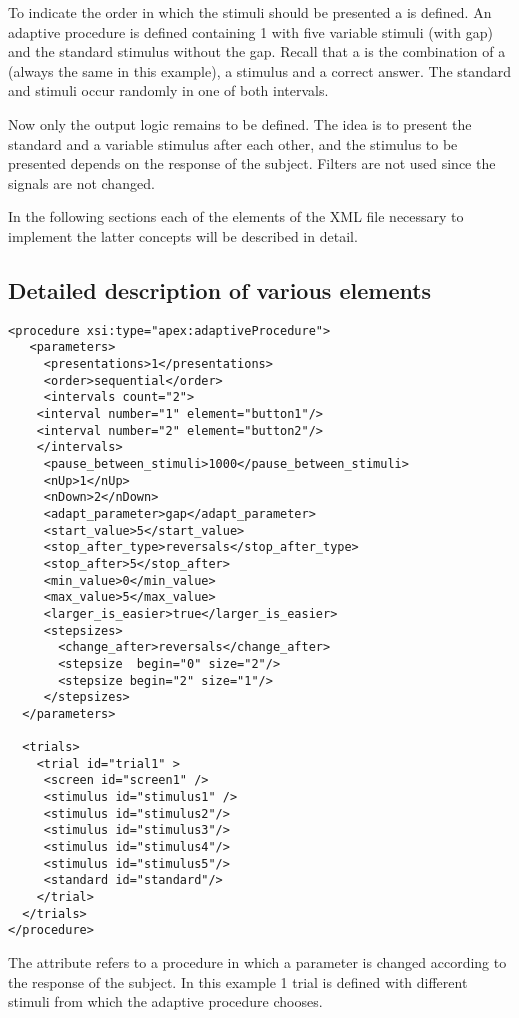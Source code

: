 To indicate the order in which the stimuli should be presented a
 is defined. An adaptive procedure is defined
containing 1  with five variable stimuli (with
gap) and the standard stimulus without the gap. Recall that a
 is the combination of a  (always
the same in this example), a stimulus and a correct answer. The
standard and stimuli occur randomly in one of both intervals.

Now only the output logic remains to be defined. The idea is to
present the standard and a variable stimulus after each other, and
the stimulus to be presented depends on the response of the
subject. Filters are not used since the signals are not changed.

In the following sections each of the elements of the XML file
necessary to implement the latter concepts will be described in
detail.

\subsection{Detailed description of various elements}

\begin{lstlisting} 
<procedure xsi:type="apex:adaptiveProcedure">
   <parameters>
     <presentations>1</presentations>
     <order>sequential</order>
     <intervals count="2">
	<interval number="1" element="button1"/>
	<interval number="2" element="button2"/>
	</intervals>
     <pause_between_stimuli>1000</pause_between_stimuli>
     <nUp>1</nUp>
     <nDown>2</nDown>
     <adapt_parameter>gap</adapt_parameter>
     <start_value>5</start_value>
     <stop_after_type>reversals</stop_after_type>
     <stop_after>5</stop_after>
     <min_value>0</min_value>
     <max_value>5</max_value>
     <larger_is_easier>true</larger_is_easier>
     <stepsizes>
       <change_after>reversals</change_after>
       <stepsize  begin="0" size="2"/>
       <stepsize begin="2" size="1"/>
     </stepsizes>
  </parameters>

  <trials>
    <trial id="trial1" >
     <screen id="screen1" />
     <stimulus id="stimulus1" />
     <stimulus id="stimulus2"/>
     <stimulus id="stimulus3"/>
     <stimulus id="stimulus4"/>
     <stimulus id="stimulus5"/>
     <standard id="standard"/>
    </trial>
  </trials>
</procedure>
\end{lstlisting}


 The attribute
 refers to a procedure in which a parameter is changed according to
the response of the subject. In this example 1 trial is defined
with different stimuli from which the adaptive procedure chooses.

